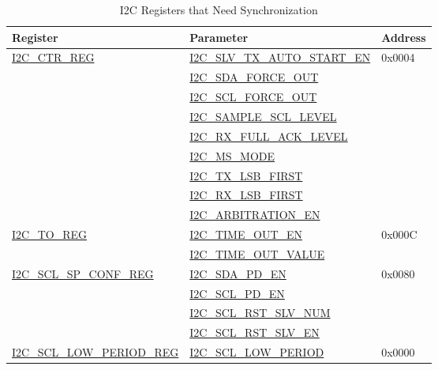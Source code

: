 \documentclass[main\_\_EN.tex]{subfiles}
\begin{document}
\begin{longtable}{ | p{6cm} | p{7cm} | p{2cm} | }
\caption{I2C Registers that Need Synchronization}
\label{tab:i2c-sync-register}
\\\hline
\rowcolor{lightgray}
Register & Parameter & Address  \\ \hline


\hyperref[regdesc:I2CCTRREG]{I2C\_CTR\_REG} & {\hyperref[fielddesc:I2CSLVTXAUTOSTARTEN]{I2C\_SLV\_TX\_AUTO\_START\_EN}} & 0x0004  \\\cline{2-2}


& {\hyperref[fielddesc:I2CSDAFORCEOUT]{I2C\_SDA\_FORCE\_OUT}}& \\\cline{2-2}
& {\hyperref[fielddesc:I2CSCLFORCEOUT]{I2C\_SCL\_FORCE\_OUT}}& \\\cline{2-2}
& {\hyperref[fielddesc:I2CSAMPLESCLLEVEL]{I2C\_SAMPLE\_SCL\_LEVEL}}& \\\cline{2-2}
& {\hyperref[fielddesc:I2CRXFULLACKLEVEL]{I2C\_RX\_FULL\_ACK\_LEVEL}}& \\\cline{2-2}
& {\hyperref[fielddesc:I2CMSMODE]{I2C\_MS\_MODE}}& \\\cline{2-2}
& {\hyperref[fielddesc:I2CTXLSBFIRST]{I2C\_TX\_LSB\_FIRST}}& \\\cline{2-2}
& {\hyperref[fielddesc:I2CRXLSBFIRST]{I2C\_RX\_LSB\_FIRST}}& \\\cline{2-2}
& {\hyperref[fielddesc:I2CARBITRATIONEN]{I2C\_ARBITRATION\_EN}}& \\ \hline

\hyperref[regdesc:I2CTOREG]{I2C\_TO\_REG} & {\hyperref[fielddesc:I2CTIMEOUTEN]{I2C\_TIME\_OUT\_EN}} & 0x000C  \\\cline{2-2}
& {\hyperref[fielddesc:I2CTIMEOUTVALUE]{I2C\_TIME\_OUT\_VALUE}}& \\ \hline



\hyperref[regdesc:I2CSCLSPCONFREG]{I2C\_SCL\_SP\_CONF\_REG} & {\hyperref[fielddesc:I2CSDAPDEN]{I2C\_SDA\_PD\_EN}} & 0x0080  \\\cline{2-2}
& {\hyperref[fielddesc:I2CSCLPDEN]{I2C\_SCL\_PD\_EN}}& \\\cline{2-2}
& {\hyperref[fielddesc:I2CSCLRSTSLVNUM]{I2C\_SCL\_RST\_SLV\_NUM}}& \\\cline{2-2}
& {\hyperref[fielddesc:I2CSCLRSTSLVEN]{I2C\_SCL\_RST\_SLV\_EN}}& \\ \hline


\hyperref[regdesc:I2CSCLLOWPERIODREG]{I2C\_SCL\_LOW\_PERIOD\_REG} & \hyperref[fielddesc:I2CSCLLOWPERIOD]{I2C\_SCL\_LOW\_PERIOD} & 0x0000  \\ \hline


\end{longtable}
\end{document}
